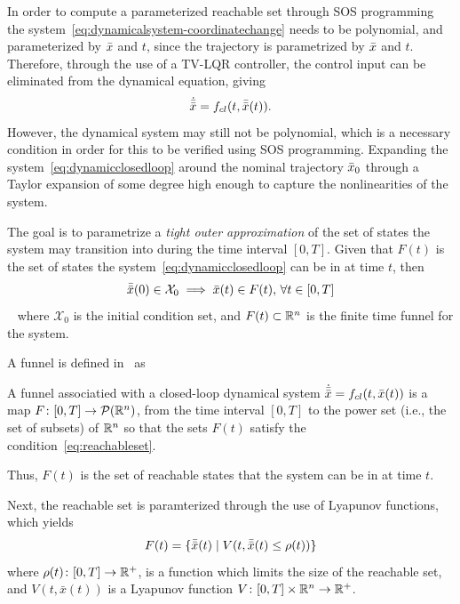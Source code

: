In order to compute a parameterized reachable set through \ac{SOS} programming
the system~\cref{eq:dynamicalsystem-coordinatechange} needs to be polynomial,
and parameterized by \(\bar{x}\) and \(t\), since the trajectory is parametrized by
\(\bar{x}\) and \(t\). Therefore, through the use of a \ac{TV-LQR} controller, the
control input can be eliminated from the dynamical equation, giving
\begin{equation}
  \label{eq:dynamicclosedloop}
  \dot{\bar{\bar{x}}} = f_{cl}(t,\bar{\bar{x}}(t)).
\end{equation}
However, the dynamical system may still not be polynomial, which is a necessary
condition in order for this to be verified using \ac{SOS} programming. Expanding
the system~\cref{eq:dynamicclosedloop} around the nominal trajectory \(\bar{x}_0\)
through a Taylor expansion of some degree high enough to capture the
nonlinearities of the system.

The goal is to parametrize a \textit{tight outer approximation} of the set of
states the system may transition into during the time interval \([0,T]\). Given
that \(F(t)\) is the set of states the system~\cref{eq:dynamicclosedloop} can be
in at time \(t\), then
\begin{equation}
  \label{eq:reachableset}
  \bar{\bar{x}}(0) \in \mathcal{X}_0 \implies \bar{x}(t) \in F(t), \, \forall t \in [0,T]
\end{equation}~\cite{majumdarFunnelLibrariesRealtime2017} 
where \(\mathcal{X}_0\) is the initial condition set, and \(F(t) \subset \mathbb{R}^n\)
is the finite time funnel for the system.

A funnel is defined in~\cite[Majumdar]{majumdarFunnelLibrariesRealtime2017} as
\begin{definition}
  \label{def:funnel}
  A funnel associatied with a closed-loop dynamical system \(\dot{\bar{\bar{x}}} =
  f_{cl}(t,\bar{x}(t))\) is a map \(F \colon [0,T] \rightarrow \mathcal{P}(\mathbb{R}^n)\),
  from the time interval \([0,T]\) to the power set (i.e., the set of subsets)
  of \(\mathbb{R}^n\) so that the sets \(F(t)\) satisfy the
  condition~\cref{eq:reachableset}.
\end{definition}
Thus, \(F(t)\) is the set of reachable states that the system can be in at time
\(t\).

Next, the reachable set is paramterized through the use of Lyapunov functions,
which yields
\begin{equation}
  F(t) = \lbrace\bar{\bar{x}}(t) \mid V(t, \bar{\bar{x}}(t) \leq \rho (t))\rbrace
\end{equation}
where \(\rho (t) \colon [0,T] \rightarrow \mathbb{R}^+\), is a function which limits the
size of the reachable set, and \(V(t,\bar{x}(t))\) is a Lyapunov function \(V
\colon [0,T] \times \mathbb{R}^n \rightarrow \mathbb{R}^+\).


